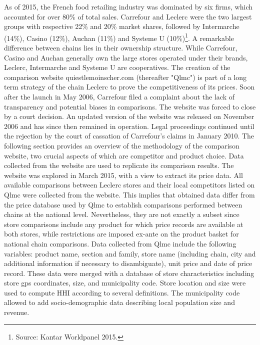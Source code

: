 \documentclass[english]{article}
\begin{document}
As of 2015, the French food retailing industry was dominated by six firms, which accounted for over 80\% of total sales. Carrefour and Leclerc were the two largest groups with respective 22\% and 20\% market shares, followed by Intermarche (14\%), Casino (12\%), Auchan (11\%) and Systeme U (10\%)\footnote{Source: Kantar Worldpanel 2015.}. A remarkable difference between chains lies in their ownership structure. While Carrefour, Casino and Auchan generally own the large stores operated under their brands, Leclerc, Intermarche and Systeme U are cooperatives. The creation of the comparison website quiestlemoinscher.com (thereafter "Qlmc") is part of a long term strategy of the chain Leclerc to prove the competitiveness of its prices. Soon after the launch in May 2006, Carrefour filed a complaint about the lack of transparency and potential biases in comparisons. The website was forced to close by a court decision. An updated version of the website was released on November 2006 and has since then remained in operation. Legal proceedings continued until the rejection by the court of cassation of Carrefour's claims in January 2010. The following section provides an overview of the methodology of the comparison website, two crucial aspects of which are competitor and product choice. Data collected from the website are used to replicate its comparison results. The website was explored in March 2015, with a view to extract its price data. All available comparisons between Leclerc stores and their local competitors listed on Qlmc were collected from the website. This implies that obtained data differ from the price database used by Qlmc to establish comparisons performed between chains at the national level. Nevertheless, they are not exactly a subset since store comparisons include any product for which price records are available at both stores, while restrictions are imposed ex-ante on the product basket for national chain comparisons. Data collected from Qlmc include the following variables: product name, section and family, store name (including chain, city and additional information if necessary to disambiguate), unit price and date of price record. These data were merged with a database of store characteristics including store gps coordinates, size, and municipality code. Store location and size were used to compute HHI according to several definitions. The municipality code allowed to add socio-demographic data describing local population size and revenue.

\end{document}

